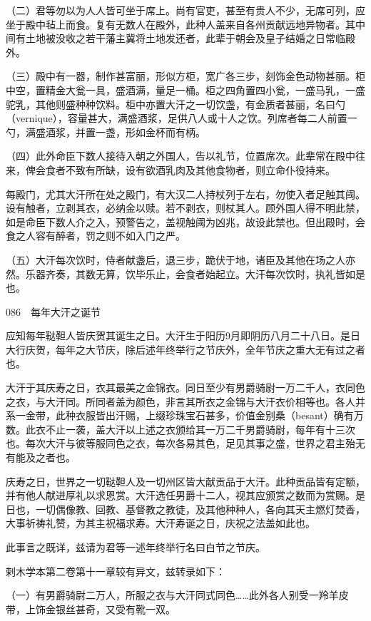 \documentclass[12pt,UTF8]{ctexbook}
\begin{document}
（二）君等勿以为人人皆可坐于席上。尚有官吏，甚至有贵人不少，无席可列，应坐于殿中毡上而食。复有无数人在殿外，此种人盖来自各州贡献远地异物者。其中间有土地被没收之若干藩主冀将土地发还者，此辈于朝会及皇子结婚之日常临殿外。

（三）殿中有一器，制作甚富丽，形似方柜，宽广各三步，刻饰金色动物甚丽。柜中空，置精金大瓮一具，盛酒满，量足一桶。柜之四角置四小瓮，一盛马乳，一盛驼乳，其他则盛种种饮料。柜中亦置大汗之一切饮盏，有金质者甚丽，名曰勺（vernique），容量甚大，满盛酒浆，足供八人或十人之饮。列席者每二人前置一勺，满盛酒浆，并置一盏，形如金杯而有柄。

（四）此外命臣下数人接待入朝之外国人，告以礼节，位置席次。此辈常在殿中往来，俾会食者不致有所缺，设有欲酒乳肉及其他食物者，则立命仆役持来。

每殿门，尤其大汗所在处之殿门，有大汉二人持杖列于左右，勿使入者足触其阈。设有触者，立剥其衣，必纳金以赎。若不剥衣，则杖其人。顾外国人得不明此禁，如是命臣下数人介之入，预警告之，盖视触阈为凶兆，故设此禁也。但出殿时，会食之人容有醉者，罚之则不如入门之严。

（五）大汗每次饮时，侍者献盏后，退三步，跪伏于地，诸臣及其他在场之人亦然。乐器齐奏，其数无算，饮毕乐止，会食者始起立。大汗每次饮时，执礼皆如是也。





086　每年大汗之诞节

应知每年鞑靼人皆庆贺其诞生之日。大汗生于阳历9月即阴历八月二十八日。是日大行庆贺，每年之大节庆，除后述年终举行之节庆外，全年节庆之重大无有过之者也。

大汗于其庆寿之日，衣其最美之金锦衣。同日至少有男爵骑尉一万二千人，衣同色之衣，与大汗同。所同者盖为颜色，非言其所衣之金锦与大汗衣价相等也。各人并系一金带，此种衣服皆出汗赐，上缀珍珠宝石甚多，价值金别桑（besant）确有万数。此衣不止一袭，盖大汗以上述之衣颁给其一万二千男爵骑尉，每年有十三次也。每次大汗与彼等服同色之衣，每次各易其色，足见其事之盛，世界之君主殆无有能及之者也。

庆寿之日，世界之一切鞑靼人及一切州区皆大献贡品于大汗。此种贡品皆有定额，并有他人献进厚礼以求恩赏。大汗选任男爵十二人，视其应颁赏之数而为赏赐。是日也，一切偶像教、回教、基督教之教徒，及其他种种人，各向其天主燃灯焚香，大事祈祷礼赞，为其主祝福求寿。大汗寿诞之日，庆祝之法盖如此也。

此事言之既详，兹请为君等一述年终举行名曰白节之节庆。

剌木学本第二卷第十一章较有异文，兹转录如下：

（一）有男爵骑尉二万人，所服之衣与大汗同式同色……此外各人别受一羚羊皮带，上饰金银丝甚奇，又受有靴一双。
\end{document}
